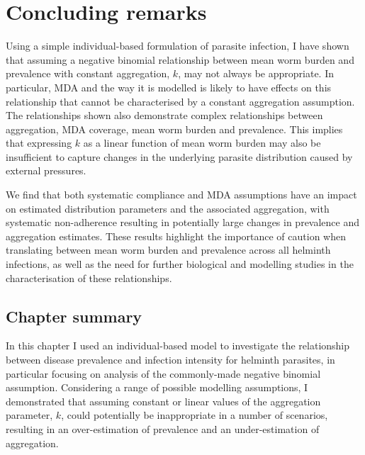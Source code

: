 \FloatBarrier

\section{Concluding remarks}

Using a simple individual-based formulation of parasite infection, I have shown that assuming a negative binomial relationship between mean worm burden and prevalence with constant aggregation, $k$, may not always be appropriate. In particular, MDA and the way it is modelled is likely to have effects on this relationship that cannot be characterised by a constant aggregation assumption. The relationships shown also demonstrate complex relationships between aggregation, MDA coverage, mean worm burden and prevalence. This implies that expressing $k$ as a linear function of mean worm burden may also be insufficient to capture changes in the underlying parasite distribution caused by external pressures.

We find that both systematic compliance and MDA assumptions have an impact on estimated distribution parameters and the associated aggregation, with systematic non-adherence resulting in potentially large changes in prevalence and aggregation estimates. These results highlight the importance of caution when translating between mean worm burden and prevalence across all helminth infections, as well as the need for further biological and modelling studies in the characterisation of these relationships.

\subsection{Chapter summary}

In this chapter I used an individual-based model to investigate the relationship between disease prevalence and infection intensity for helminth parasites, in particular focusing on analysis of the commonly-made negative binomial assumption. Considering a range of possible modelling assumptions, I demonstrated that assuming constant or linear values of the aggregation parameter, $k$, could potentially be inappropriate in a number of scenarios, resulting in an over-estimation of prevalence and an under-estimation of aggregation.